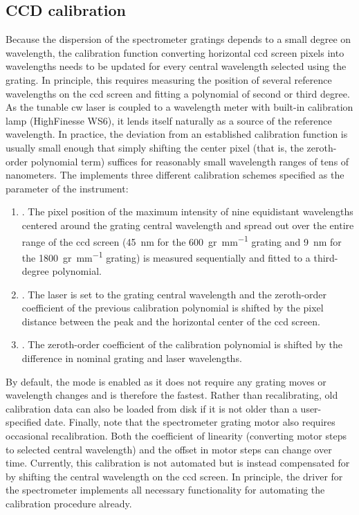 \subsection{CCD calibration}\label{subsec:sec:exp:mjolnir:calibration:ccd}
Because the dispersion of the spectrometer gratings depends to a small degree on wavelength, the calibration function converting horizontal \gls{ccd} screen pixels into wavelengths needs to be updated for every central wavelength selected using the grating.
In principle, this requires measuring the position of several reference wavelengths on the \gls{ccd} screen and fitting a polynomial of second or third degree.
As the tunable \gls{cw} laser is coupled to a wavelength meter with built-in calibration lamp (HighFinesse WS6), it lends itself naturally as a source of the reference wavelength.
In practice, the deviation from an established calibration function is usually small enough that simply shifting the center pixel (that is, the zeroth-order polynomial term) suffices for reasonably small wavelength ranges of tens of nanometers.
The  implements three different calibration schemes specified as the  parameter of the  instrument:
\begin{enumerate}
    \item {}.
        The pixel position of the maximum intensity of nine equidistant wavelengths centered around the grating central wavelength and spread out over the entire range of the \gls{ccd} screen (\qty{45}{\nano\meter} for the \qty{600}{gr\per\milli\meter} grating and \qty{9}{\nano\meter} for the \qty{1800}{gr\per\milli\meter} grating) is measured sequentially and fitted to a third-degree polynomial.
    \item {}.
        The laser is set to the grating central wavelength and the zeroth-order coefficient of the previous calibration polynomial is shifted by the pixel distance between the peak and the horizontal center of the \gls{ccd} screen.
    \item {}.
        The zeroth-order coefficient of the calibration polynomial is shifted by the difference in nominal grating and laser wavelengths.
\end{enumerate}
By default, the  mode is enabled as it does not require any grating moves or wavelength changes and is therefore the fastest.
Rather than recalibrating, old calibration data can also be loaded from disk if it is not older than a user-specified date.
Finally, note that the spectrometer grating motor also requires occasional recalibration.
Both the coefficient of linearity (converting motor steps to selected central wavelength) and the offset in motor steps can change over time.
Currently, this calibration is not automated but is instead compensated for by shifting the central wavelength on the \gls{ccd} screen.
In principle, the driver for the \thespectrometer spectrometer implements all necessary functionality for automating the calibration procedure already.

